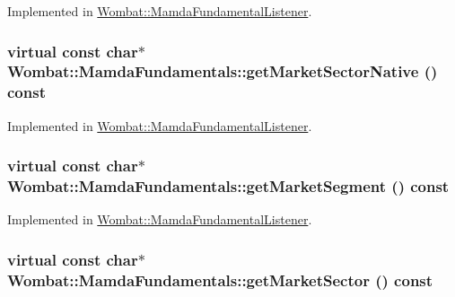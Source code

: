 Implemented in \hyperlink{classWombat_1_1MamdaFundamentalListener_579d342071f318ca31a7fc55e11f9ea3}{Wombat::Mamda\-Fundamental\-Listener}.\hypertarget{classWombat_1_1MamdaFundamentals_185d4ae26f9a5f362b01dff364f9c9ee}{
\subsubsection[getMarketSectorNative]{\setlength{\rightskip}{0pt plus 5cm}virtual const char$\ast$ Wombat::Mamda\-Fundamentals::get\-Market\-Sector\-Native () const}}
\label{classWombat_1_1MamdaFundamentals_185d4ae26f9a5f362b01dff364f9c9ee}




Implemented in \hyperlink{classWombat_1_1MamdaFundamentalListener_5451ffdbcd4d4833e7fce5e19d2a3282}{Wombat::Mamda\-Fundamental\-Listener}.\hypertarget{classWombat_1_1MamdaFundamentals_f96bd6fe7c76ce21ccebff0e1090ab4e}{
\subsubsection[getMarketSegment]{\setlength{\rightskip}{0pt plus 5cm}virtual const char$\ast$ Wombat::Mamda\-Fundamentals::get\-Market\-Segment () const}}
\label{classWombat_1_1MamdaFundamentals_f96bd6fe7c76ce21ccebff0e1090ab4e}




Implemented in \hyperlink{classWombat_1_1MamdaFundamentalListener_7f2643689fe51a96a052eebcc6d50e9a}{Wombat::Mamda\-Fundamental\-Listener}.\hypertarget{classWombat_1_1MamdaFundamentals_b49dbddda075e93738faebcc391ac223}{
\subsubsection[getMarketSector]{\setlength{\rightskip}{0pt plus 5cm}virtual const char$\ast$ Wombat::Mamda\-Fundamentals::get\-Market\-Sector () const}}
\label{classWombat_1_1MamdaFundamentals_b49dbddda075e93738faebcc391ac223}




